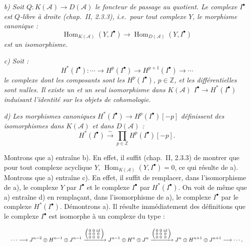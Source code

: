 \clearpage
{}%
\begingroup\small\setlength{\parskip}{0pt}\setlength{\emergencystretch}{1.5em}
\setlength{\abovedisplayskip}{4pt plus 2pt minus 2pt}%
\setlength{\belowdisplayskip}{4pt plus 2pt minus 2pt}%

\noindent\textit{b) Soit
$Q\colon K(\mathcal A)\longrightarrow D(\mathcal A)$ le foncteur de
passage au quotient. Le complexe $I^\bullet$ est $Q$-libre à droite
(chap.~II, 2.3.3), i.e.\ pour tout complexe $Y$, le morphisme canonique :}
\[
\operatorname{Hom}_{K(\mathcal A)}(Y,I^\bullet)
\longrightarrow\operatorname{Hom}_{D(\mathcal A)}(Y,I^\bullet)
\]
\textit{est un isomorphisme.}

\noindent\textit{c) Soit :}
\[
H^*(I^\bullet)\colon\cdots\longrightarrow H^p(I^\bullet)
\longrightarrow H^{p+1}(I^\bullet)\longrightarrow\cdots
\]
\textit{le complexe dont les composants sont les $H^p(I^\bullet)$,
$p\in\mathbb Z$, et les différentielles sont nulles. Il existe un et un
seul isomorphisme dans $K(\mathcal A)$
$I^\bullet\longrightarrow H^*(I^\bullet)$ induisant l'identité sur les
objets de cohomologie.}

\noindent\textit{d) Les morphismes canoniques
$H^*(I^\bullet)\longrightarrow H^p(I^\bullet)[-p]$ définissent des
isomorphismes dans $K(\mathcal A)$ et dans $D(\mathcal A)$ :}
\[
H^*(I^\bullet)\xrightarrow{\sim}
\prod_{p\in\mathbb Z}H^p(I^\bullet)[-p].
\]

Montrons que a) entraîne b). En effet, il suffit (chap.~II, 2.3.3) de
montrer que pour tout complexe acyclique $Y$,
$\operatorname{Hom}_{K(\mathcal A)}(Y,I^\bullet)=0$, ce qui résulte de a).
Montrons que a) entraîne c). En effet, il suffit de remplacer, dans
l'isomorphisme de a), le complexe $Y$ par $I^\bullet$ et le complexe
$I^\bullet$ par $H^*(I^\bullet)$. On voit de même que a) entraîne d) en
remplaçant, dans l'isomorphisme de a), le complexe $I^\bullet$ par le
complexe $H^*(I^\bullet)$. Démontrons a). Il résulte immédiatement des
définitions que le complexe $I^\bullet$ est isomorphe à un complexe du
type :

\[
\resizebox{0.98\linewidth}{!}{$
\displaystyle
\cdots\longrightarrow
J^{n-2}\oplus H^{n-1}\oplus J^{n-1}
\xrightarrow{\left(\begin{smallmatrix}
0&0&\mathrm{id}\\0&0&0\\0&0&0
\end{smallmatrix}\right)}
J^{n-1}\oplus H^n\oplus J^n
\xrightarrow{\left(\begin{smallmatrix}
0&0&\mathrm{id}\\0&0&0\\0&0&0
\end{smallmatrix}\right)}
J^n\oplus H^{n+1}\oplus J^{n+1}
\longrightarrow\cdots
$}.
\]

